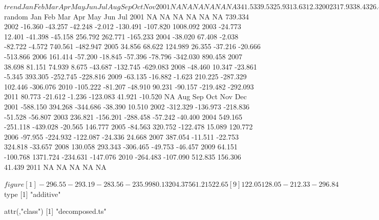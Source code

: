 \documentclass{article}\usepackage{graphicx, color}
\begin{document}
\begin{center}
\begin{Schunk}
\begin{Soutput}
$trend
       Jan   Feb   Mar   Apr   May   Jun   Jul   Aug   Sep   Oct   Nov
2001    NA    NA    NA    NA    NA    NA 341.5 339.5 325.9 313.6 312.3
2002 317.9 338.4 326.4 309.2 314.8 314.4 314.1 315.3 316.4 315.6 331.2
2003 331.1 306.2 329.8 327.9 325.8 325.3 325.3 329.9 337.4 340.1 330.0
2004 351.6 354.4 365.5 356.5 353.0 361.6 367.1 361.1 354.7 353.4 347.4
2005 261.9 224.6 213.2 241.6 248.1 242.0 245.1 252.1 251.8 251.0 252.4
2006 295.7 359.2 340.8 323.0 326.2 325.9 318.1 311.1 310.5 310.0 309.1
2007 257.8 212.6 240.4 252.7 272.2 286.8 286.9 291.9 297.9 305.0 332.3
2008 369.0 379.8 386.1 391.1 366.4 350.4 348.8 346.8 345.6 356.5 344.7
2009 367.7 374.6 368.1 433.1 505.7 503.2 503.3 500.9 495.6 482.0 469.2
2010 411.8 379.9 347.8 294.4 258.6 269.1 274.6 278.4 281.8 279.2 282.4
2011 309.8 328.6 373.7 371.0 340.4 335.2    NA    NA    NA    NA    NA
       Dec
2001 309.5
2002 363.7
2003 341.6
2004 305.0
2005 244.1
2006 315.4
2007 352.1
2008 343.3
2009 443.9
2010 302.8
2011    NA

$random
          Jan      Feb      Mar      Apr      May      Jun      Jul
2001       NA       NA       NA       NA       NA       NA  739.334
2002  -16.360  -43.257  -42.248   -2.012 -130.491 -107.820 1008.092
2003  -24.773   12.401  -41.398  -45.158  256.792  262.771 -165.233
2004  -38.020   67.408   -2.038  -82.722   -4.572  740.561 -482.947
2005   34.856   68.622  124.989   26.355  -37.216  -20.666 -513.866
2006  161.414  -57.200  -18.845  -57.396  -78.796 -342.030  890.458
2007   38.698   81.151   74.939    8.675  -43.687 -132.745 -629.083
2008  -48.460   10.347  -23.861   -5.345  393.305 -252.745 -228.816
2009  -63.135  -16.882   -1.623  210.225 -287.329  102.446 -306.076
2010 -105.222  -81.207  -48.910   90.231  -90.157 -219.482 -292.093
2011   80.773  -21.612   -1.236 -123.083   41.921  -10.520       NA
          Aug      Sep      Oct      Nov      Dec
2001 -588.150  394.268 -344.686  -38.390   10.510
2002 -312.329 -136.973 -218.836  -51.528  -56.807
2003  236.821 -156.201 -288.458  -57.242  -40.400
2004  549.165 -251.118 -439.028  -20.565  146.777
2005  -84.563  320.752 -122.478   15.089  120.772
2006  -97.955 -224.932 -122.087  -24.336   24.668
2007  387.054  -11.511  -22.753  324.818  -33.657
2008  130.058  293.343 -306.465  -49.753  -46.457
2009   64.151 -100.768 1371.724 -234.631 -147.076
2010 -264.483 -107.090  512.835  156.306   41.439
2011       NA       NA       NA       NA       NA

$figure
 [1] -296.55 -293.19 -283.56 -235.99   80.13  204.37  561.21  522.65
 [9]  122.05  128.05 -212.33 -296.84

$type
[1] "additive"

attr(,"class")
[1] "decomposed.ts"
\end{Soutput}
\end{Schunk}

\end{center}
\end{document}
